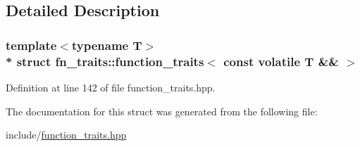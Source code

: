 \subsection{Detailed Description}
\subsubsection*{template$<$typename T$>$\\*
struct fn\+\_\+traits\+::function\+\_\+traits$<$ const volatile T \&\& $>$}



Definition at line 142 of file function\+\_\+traits.\+hpp.



The documentation for this struct was generated from the following file\+:\begin{DoxyCompactItemize}
\item 
include/\hyperlink{function__traits_8hpp}{function\+\_\+traits.\+hpp}\end{DoxyCompactItemize}
